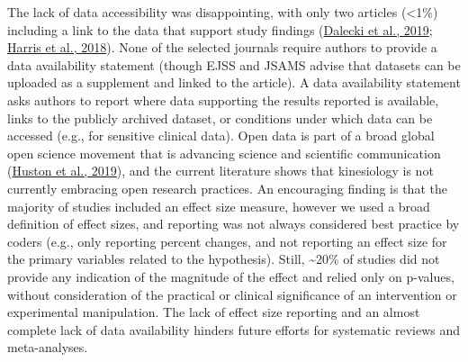 \documentclass[]{cik}%
\begin{document}
The lack of data accessibility was disappointing, with only two articles
(\textless1\%) including a link to the data that support study findings
(\protect\hyperlink{ref-Dalecki2019}{Dalecki et al., 2019};
\protect\hyperlink{ref-Harris2018}{Harris et al., 2018}). None of the
selected journals require authors to provide a data availability
statement (though EJSS and JSAMS advise that datasets can be uploaded as
a supplement and linked to the article). A data availability statement
asks authors to report where data supporting the results reported is
available, links to the publicly archived dataset, or conditions under
which data can be accessed (e.g., for sensitive clinical data). Open
data is part of a broad global open science movement that is advancing
science and scientific communication
(\protect\hyperlink{ref-Huston2019}{Huston et al., 2019}), and the
current literature shows that kinesiology is not currently embracing
open research practices. An encouraging finding is that the majority of
studies included an effect size measure, however we used a broad
definition of effect sizes, and reporting was not always considered best
practice by coders (e.g., only reporting percent changes, and not
reporting an effect size for the primary variables related to the
hypothesis). Still, \textasciitilde20\% of studies did not provide any
indication of the magnitude of the effect and relied only on p-values,
without consideration of the practical or clinical significance of an
intervention or experimental manipulation. The lack of effect size
reporting and an almost complete lack of data availability hinders
future efforts for systematic reviews and meta-analyses.
\end{document}
